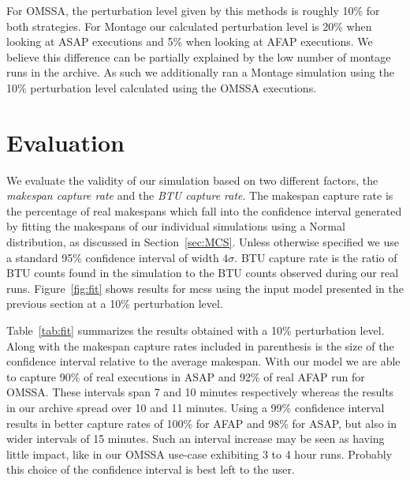 \documentclass[10pt,conference,compsocconf]{IEEEtran}
\begin{document}
For OMSSA, the perturbation level given by this methods is roughly 10\% for both
strategies. For Montage  our calculated perturbation level is  20\% when looking
at ASAP  executions and  5\% when  looking at AFAP  executions. We  believe this
difference can be partially  explained by the low number of  montage runs in the
archive. As such we additionally ran a Montage simulation using the 10\% 
perturbation level calculated using the OMSSA executions.

\section{Evaluation}
\label{sec:eval}


We evaluate the  validity of our simulation based on  two different factors, the
\emph{makespan capture  rate} and  the \emph{BTU capture rate}.   The makespan
capture rate is the percentage of  real makespans which fall into the confidence
interval generated by fitting the  makespans of our individual simulations using
a Normal distribution, as  discussed in Section~\ref{sec:MCS}.  Unless otherwise
specified we  use a standard 95\%  confidence interval of width  $4\sigma$.  BTU
capture rate is the ratio of BTU counts found in the simulation to the BTU
counts observed  during our  real runs.  Figure~\ref{fig:fit} shows  results for
\acp{mcs} using  the input  model presented  in the previous  section at  a 10\%
perturbation level.

Table~\ref{tab:fit}  summarizes the  results obtained  with a  10\% perturbation
level. Along with the makespan capture rates included in parenthesis is the size
of the confidence interval relative to  the average makespan.  With our model we
are able to  capture 90\% of real executions  in ASAP and 92\% of  real AFAP run
for OMSSA\@.  These intervals  span 7  and 10  minutes respectively  whereas the
results in our archive  spread over 10 and 11 minutes.   Using a 99\% confidence
interval results in  better capture rates of  100\% for AFAP and  98\% for ASAP,
but also  in wider intervals  of 15 minutes.  Such  an interval increase  may be
seen as having little impact, like in  our OMSSA use-case exhibiting 3 to 4 hour
runs. Probably this choice of the confidence interval is best left to the user.
\end{document}

